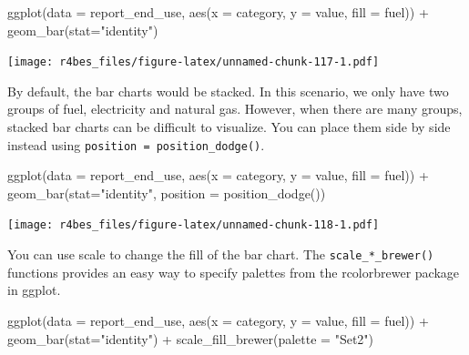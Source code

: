 \documentclass[
]{book}
\newenvironment{Shaded}{\begin{snugshade}}{\end{snugshade}}
\newcommand{\AttributeTok}[1]{\textcolor[rgb]{0.77,0.63,0.00}{#1}}
\newcommand{\FunctionTok}[1]{\textcolor[rgb]{0.00,0.00,0.00}{#1}}
\newcommand{\NormalTok}[1]{#1}
\newcommand{\SpecialCharTok}[1]{\textcolor[rgb]{0.00,0.00,0.00}{#1}}
\newcommand{\StringTok}[1]{\textcolor[rgb]{0.31,0.60,0.02}{#1}}
\begin{document}
\begin{Shaded}
\begin{Highlighting}[]
\FunctionTok{ggplot}\NormalTok{(}\AttributeTok{data =}\NormalTok{ report\_end\_use, }\FunctionTok{aes}\NormalTok{(}\AttributeTok{x =}\NormalTok{ category, }\AttributeTok{y =}\NormalTok{ value, }\AttributeTok{fill =}\NormalTok{ fuel)) }\SpecialCharTok{+}
    \FunctionTok{geom\_bar}\NormalTok{(}\AttributeTok{stat=}\StringTok{"identity"}\NormalTok{)}
\end{Highlighting}
\end{Shaded}

\texttt{[image: r4bes\_files/figure-latex/unnamed-chunk-117-1.pdf]}

By default, the bar charts would be stacked. In this scenario, we only have two groups of fuel, electricity and natural gas. However, when there are many groups, stacked bar charts can be difficult to visualize. You can place them side by side instead using \texttt{position\ =\ position\_dodge()}.

\begin{Shaded}
\begin{Highlighting}[]
\FunctionTok{ggplot}\NormalTok{(}\AttributeTok{data =}\NormalTok{ report\_end\_use, }\FunctionTok{aes}\NormalTok{(}\AttributeTok{x =}\NormalTok{ category, }\AttributeTok{y =}\NormalTok{ value, }\AttributeTok{fill =}\NormalTok{ fuel)) }\SpecialCharTok{+}
    \FunctionTok{geom\_bar}\NormalTok{(}\AttributeTok{stat=}\StringTok{"identity"}\NormalTok{, }\AttributeTok{position =} \FunctionTok{position\_dodge}\NormalTok{())}
\end{Highlighting}
\end{Shaded}

\texttt{[image: r4bes\_files/figure-latex/unnamed-chunk-118-1.pdf]}

You can use scale to change the fill of the bar chart. The \texttt{scale\_*\_brewer()} functions provides an easy way to specify palettes from the rcolorbrewer package in ggplot.

\begin{Shaded}
\begin{Highlighting}[]
\FunctionTok{ggplot}\NormalTok{(}\AttributeTok{data =}\NormalTok{ report\_end\_use, }\FunctionTok{aes}\NormalTok{(}\AttributeTok{x =}\NormalTok{ category, }\AttributeTok{y =}\NormalTok{ value, }\AttributeTok{fill =}\NormalTok{ fuel)) }\SpecialCharTok{+}
    \FunctionTok{geom\_bar}\NormalTok{(}\AttributeTok{stat=}\StringTok{"identity"}\NormalTok{) }\SpecialCharTok{+} 
    \FunctionTok{scale\_fill\_brewer}\NormalTok{(}\AttributeTok{palette =} \StringTok{"Set2"}\NormalTok{) }
\end{Highlighting}
\end{Shaded}
\end{document}
